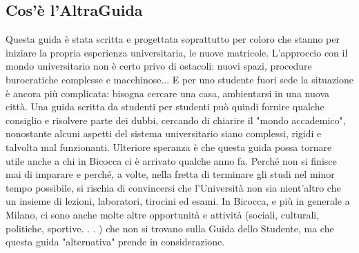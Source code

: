 \subsection{Cos’è l’AltraGuida}
Questa guida è stata scritta e progettata soprattutto per coloro che stanno per iniziare la propria esperienza universitaria, le nuove matricole. L'approccio con il mondo universitario non è certo privo di ostacoli: nuovi spazi, procedure burocratiche complesse e macchinose... E per uno studente fuori sede la situazione è ancora più complicata: bisogna cercare una casa, ambientarsi in una nuova città. Una guida scritta da studenti per studenti può quindi fornire qualche consiglio e risolvere parte dei dubbi, cercando di chiarire il "mondo accademico", nonostante alcuni aspetti del sistema universitario siano complessi, rigidi e talvolta mal funzionanti.
Ulteriore speranza è che questa guida possa tornare utile anche a chi in Bicocca ci è arrivato qualche anno fa. Perché non si finisce mai di imparare e perché, a volte, nella fretta di terminare gli studi nel minor tempo possibile, si rischia di convincersi che l'Università non sia nient'altro che un insieme di lezioni, laboratori, tirocini ed esami. In Bicocca, e più in generale a Milano, ci sono anche molte altre opportunità e attività (sociali, culturali, politiche, sportive. . . ) che non si trovano sulla Guida dello Studente, ma che questa guida "alternativa" prende in considerazione.

